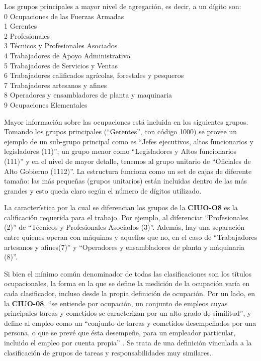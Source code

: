 \documentclass[
]{book}
\begin{document}
Los grupos principales a mayor nivel de agregación, es decir, a un dígito son:\\
0 Ocupaciones de las Fuerzas Armadas\\
1 Gerentes\\
2 Profesionales\\
3 Técnicos y Profesionales Asociados\\
4 Trabajadores de Apoyo Administrativo\\
5 Trabajadores de Servicios y Ventas\\
6 Trabajadores calificados agrícolas, forestales y pesqueros\\
7 Trabajadores artesanos y afines\\
8 Operadores y ensambladores de planta y maquinaria\\
9 Ocupaciones Elementales

Mayor información sobre las ocupaciones está incluida en los siguientes grupos. Tomando los grupos principales (``Gerentes'', con código 1000) se provee un ejemplo de un sub-grupo principal como es ``Jefes ejecutivos, altos funcionarios y legisladores (11)''; un grupo menor como ``Legisladores y Altos funcionarios (111)'' y en el nivel de mayor detalle, tenemos al grupo unitario de ``Oficiales de Alto Gobierno (1112)''. La estructura funciona como un set de cajas de diferente tamaño: las más pequeñas (grupos unitarios) están incluidas dentro de las más grandes y esto queda claro según el número de dígitos utilizado.

La característica por la cual se diferencian los grupos de la \textbf{CIUO-O8} es la calificación requerida para el trabajo. Por ejemplo, al diferenciar ``Profesionales (2)'' de ``Técnicos y Profesionales Asociados (3)''. Además, hay una separación entre quienes operan con máquinas y aquellos que no, en el caso de ``Trabajadores artesanos y afines(7)'' y ``Operadores y ensambladores de planta y máquinaria (8)''.

Si bien el mínimo común denominador de todas las clasificaciones son los títulos ocupacionales, la forma en la que se define la medición de la ocupación varía en cada clasificador, incluso desde la propia definición de ocupación. Por un lado, en la \textbf{CIUO-08}, ``se entiende por ocupación, un conjunto de empleos cuyas principales tareas y cometidos se caracterizan por un alto grado de similitud'', y define al empleo como un ``conjunto de tareas y cometidos desempeñados por una persona, o que se prevé que ésta desempeñe, para un empleador particular, incluido el empleo por cuenta propia'' \citep{OIT2008}. Se trata de una definición vinculada a la clasificación de grupos de tareas y responsabilidades muy similares.
\end{document}
